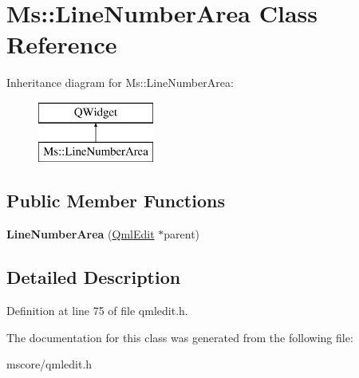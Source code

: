 \hypertarget{class_ms_1_1_line_number_area}{}\section{Ms\+:\+:Line\+Number\+Area Class Reference}
\label{class_ms_1_1_line_number_area}
Inheritance diagram for Ms\+:\+:Line\+Number\+Area\+:\begin{figure}[H]
\begin{center}
\leavevmode
\includegraphics[height=2.000000cm]{class_ms_1_1_line_number_area}
\end{center}
\end{figure}
\subsection*{Public Member Functions}
\begin{DoxyCompactItemize}
\item 
\mbox{\label{class_ms_1_1_line_number_area_a2fa7d5bf2ef9a7a29695ac8a9dec1b9d}} 
{\bfseries Line\+Number\+Area} (\hyperlink{class_ms_1_1_qml_edit}{Qml\+Edit} $\ast$parent)
\end{DoxyCompactItemize}


\subsection{Detailed Description}


Definition at line 75 of file qmledit.\+h.



The documentation for this class was generated from the following file\+:\begin{DoxyCompactItemize}
\item 
mscore/qmledit.\+h\end{DoxyCompactItemize}
